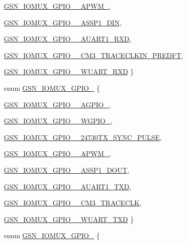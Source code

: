 \begin{DoxyCompactItemize}
\par
\hyperlink{a00519_ac07a70f0fad08cb5cef238bee66f366fa5c6c7425be8357aefe2f2d96c688e368}{GSN\_\-IOMUX\_\-GPIO\_\_\-APWM\_}, 
\par
\hyperlink{a00519_ac07a70f0fad08cb5cef238bee66f366fa5206b1e55181250c537ff7138d5dd620}{GSN\_\-IOMUX\_\-GPIO\_\_\-ASSP1\_\-DIN}, 
\par
\hyperlink{a00519_ac07a70f0fad08cb5cef238bee66f366fa829d829401da03b0528497c977241711}{GSN\_\-IOMUX\_\-GPIO\_\_\-AUART1\_\-RXD}, 
\par
\hyperlink{a00519_ac07a70f0fad08cb5cef238bee66f366fa3866c1d350b4621fd333f2fa362ff483}{GSN\_\-IOMUX\_\-GPIO\_\_\-CM3\_\-TRACECLKIN\_\-PREDFT}, 
\par
\hyperlink{a00519_ac07a70f0fad08cb5cef238bee66f366face7ca5b7cbfdf4e1e7b4cf32971bca51}{GSN\_\-IOMUX\_\-GPIO\_\_\-WUART\_\-RXD}
 \}
\item 
enum \hyperlink{a00519_a73d55f0f6dc7bbde07bf7015041a813c}{GSN\_\-IOMUX\_\-GPIO\_} \{ \par
\hyperlink{a00519_a73d55f0f6dc7bbde07bf7015041a813ca319cc67e38bfa129424e6fec059d4c1c}{GSN\_\-IOMUX\_\-GPIO\_\_\-AGPIO\_}, 
\par
\hyperlink{a00519_a73d55f0f6dc7bbde07bf7015041a813ca222efb06928fea86d7120aaa0192027a}{GSN\_\-IOMUX\_\-GPIO\_\_\-WGPIO\_}, 
\par
\hyperlink{a00519_a73d55f0f6dc7bbde07bf7015041a813ca8b51dfda07f21a16e2e31edd7549a91b}{GSN\_\-IOMUX\_\-GPIO\_\_\-24730TX\_\-SYNC\_\-PULSE}, 
\par
\hyperlink{a00519_a73d55f0f6dc7bbde07bf7015041a813caa7372efcfdafa5368f14b04f11f479d1}{GSN\_\-IOMUX\_\-GPIO\_\_\-APWM\_}, 
\par
\hyperlink{a00519_a73d55f0f6dc7bbde07bf7015041a813cae4ff08a6e758fed5aa548587c9169dd7}{GSN\_\-IOMUX\_\-GPIO\_\_\-ASSP1\_\-DOUT}, 
\par
\hyperlink{a00519_a73d55f0f6dc7bbde07bf7015041a813ca7c021261ac765ce6c424cd343d145bac}{GSN\_\-IOMUX\_\-GPIO\_\_\-AUART1\_\-TXD}, 
\par
\hyperlink{a00519_a73d55f0f6dc7bbde07bf7015041a813ca70b442e80a2cde80298383ceb7a63067}{GSN\_\-IOMUX\_\-GPIO\_\_\-CM3\_\-TRACECLK}, 
\par
\hyperlink{a00519_a73d55f0f6dc7bbde07bf7015041a813cad32af8d4d8e91692471d06095661ee77}{GSN\_\-IOMUX\_\-GPIO\_\_\-WUART\_\-TXD}
 \}
\item 
enum \hyperlink{a00519_aaf45619e34942d75bfc7e204f9074436}{GSN\_\-IOMUX\_\-GPIO\_} \{ \par

\end{DoxyCompactItemize}
